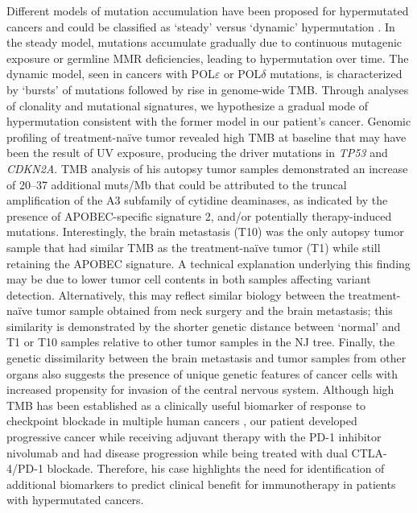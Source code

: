 Different models of mutation accumulation have been proposed for hypermutated cancers and could be classified as `steady' versus `dynamic' hypermutation \cite{campbell2017}. In the steady model, mutations accumulate gradually due to continuous mutagenic exposure or germline MMR deficiencies, leading to hypermutation over time. The dynamic model, seen in cancers with POL$\varepsilon$ or POL$\delta$ mutations, is characterized by `bursts' of mutations followed by rise in genome-wide TMB. Through analyses of clonality and mutational signatures, we hypothesize a gradual mode of hypermutation consistent with the former model in our patient's cancer. Genomic profiling of treatment-na\"ive tumor revealed high TMB at baseline that may have been the result of UV exposure, producing the driver mutations in \textit{TP53} and \textit{CDKN2A}\@. TMB analysis of his autopsy tumor samples demonstrated an increase of \textapprox{}20--37 additional muts/Mb that could be attributed to the truncal amplification of the A3 subfamily of cytidine deaminases, as indicated by the presence of APOBEC-specific signature 2, and/or potentially therapy-induced mutations. Interestingly, the brain metastasis (T10) was the only autopsy tumor sample that had similar TMB as the treatment-na\"ive tumor (T1) while still retaining the APOBEC signature. A technical explanation underlying this finding may be due to lower tumor cell contents in both samples affecting variant detection. Alternatively, this may reflect similar biology between the treatment-na\"ive tumor sample obtained from neck surgery and the brain metastasis; this similarity is demonstrated by the shorter genetic distance between `normal' and T1 or T10 samples relative to other tumor samples in the NJ tree. Finally, the genetic dissimilarity between the brain metastasis and tumor samples from other organs also suggests the presence of unique genetic features of cancer cells with increased propensity for invasion of the central nervous system. Although high TMB has been established as a clinically useful biomarker of response to checkpoint blockade in multiple human cancers \cite{yarchoan2017,gibney2016}, our patient developed progressive cancer while receiving adjuvant therapy with the PD-1 inhibitor nivolumab and had disease progression while being treated with dual \mbox{CTLA-4/PD-1} blockade. Therefore, his case highlights the need for identification of additional biomarkers to predict clinical benefit for immunotherapy in patients with hypermutated cancers.

